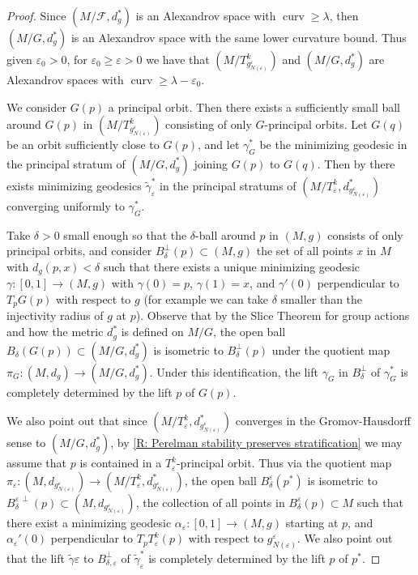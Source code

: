 \documentclass[12pt,a4paper,reqno]{amsart}
\theoremstyle{definition}
\numberwithin{equation}{section}
\newcommand{\fol}{\mathcal{F}}
\DeclareMathOperator{\curv}{curv}
\begin{document}
\begin{proof}
Since $(M/\fol,d^\ast_g)$ is an Alexandrov space with $\curv \geq \lambda$, then $(M/G,d^\ast_g)$ is an Alexandrov space with the same lower curvature bound. Thus given $\varepsilon_0>0$, for $\varepsilon_0\geq \varepsilon>0$ we have that $(M/T^k_{g^\varepsilon_{N(\varepsilon)}})$ and $(M/G,d^\ast_g)$ are Alexandrov spaces with $\curv \geq \lambda-\varepsilon_0$. 

We consider $G(p)$ a principal orbit. Then there exists a sufficiently small ball around $G(p)$ in  $(M/T^k_{g^\varepsilon_{N(\varepsilon)}})$ consisting of only $G$-principal orbits. Let $G(q)$ be an orbit sufficiently close to $G(p)$, and let $\gamma^\ast_G$ be the minimizing geodesic in the principal stratum of $(M/G,d^\ast_g)$ joining $G(p)$ to $G(q)$. Then by \cite[Lemma 2.2]{GrovePetersen1991} there exists minimizing geodesics $\tilde{\gamma}^\ast_\varepsilon$ in the principal stratums of $(M/T^k_{\varepsilon},d^\ast_{g^\varepsilon_{N(\varepsilon)}})$ converging uniformly to $\gamma^\ast_G$.

Take $\delta>0$ small enough so that the $\delta$-ball around $p$ in $(M,g)$ consists of only principal orbits, and consider $B_\delta^\perp(p)\subset (M,g)$ the set of all points $x$ in $M$ with $d_{g}(p,x)<\delta$ such that there exists a unique minimizing geodesic $\gamma\colon [0,1]\to (M,g)$  with $\gamma(0) = p$, $\gamma(1) = x$, and $\gamma'(0)$ perpendicular to $T_pG(p)$ with respect to $g$ (for example we can take $\delta$ smaller than the injectivity radius of $g$ at $p$). Observe that by the Slice Theorem for group actions and how the metric $d^\ast_g$ is defined on $M/G$,  the open ball $B_\delta(G(p))\subset (M/G,d^\ast_g)$ is isometric to $B_\delta^\perp(p)$ under the quotient map $\pi_G\colon (M,d_g)\to (M/G,d_g^\ast)$. Under this identification, the lift $\gamma_G$ in $B_\delta^\perp$ of $\gamma^\ast_G$ is completely determined by the lift $p$ of $G(p)$. 

We also point out that since $(M/T^k_\varepsilon,d^\ast_{g^\varepsilon_{N(\varepsilon)}})$ converges in the Gromov-Hausdorff sense to $(M/G,d^\ast_g)$, by \th\ref{R: Perelman stability preserves stratification} we may assume that $p$ is contained in a $T^k_\varepsilon$-principal orbit. Thus via the quotient map $\pi_{\varepsilon}\colon (M,d_{g^\varepsilon_{N(\varepsilon)}})\to (M/T^k_\varepsilon,d^\ast_{g^\varepsilon_{N(\varepsilon)}})$, the open ball $B^{\varepsilon}_\delta(p^\ast)$ is isometric to $B_\delta^{\varepsilon\, \perp}(p)\subset (M,d_{g^\varepsilon_{N(\varepsilon)}})$, the collection of all points in $B^\varepsilon_\delta(p)\subset M$ such that there exist a minimizing geodesic $\alpha_\varepsilon\colon [0,1]\to (M,g)$ starting at $p$,  and $\alpha_\varepsilon'(0)$ perpendicular to $T_pT^k_\varepsilon(p)$ with respect to $g^\varepsilon_{N(\varepsilon)}$. We also point out that the lift $\tilde{\gamma}\varepsilon$ to $B_{\delta,\varepsilon}^\perp$ of $\tilde{\gamma}^\ast_\varepsilon$ is completely determined by the lift $p$ of $p^\ast$.


\end{proof}
\end{document}
